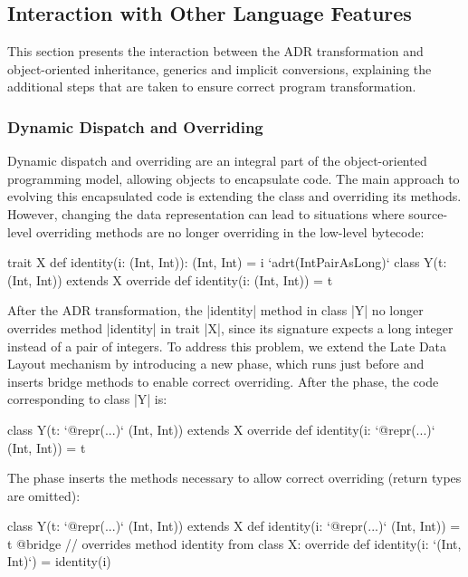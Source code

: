 \subsection{Interaction with Other Language Features}
\label{sec:ildl:language-features}

This section presents the interaction between the ADR transformation and object-oriented inheritance, generics and implicit conversions, explaining the additional steps that are taken to ensure correct program transformation.

\subsubsection*{Dynamic Dispatch and Overriding}
\label{sec:ildl:language-overriding}
Dynamic dispatch and overriding are an integral part of the object-oriented programming model, allowing objects to encapsulate code. The main approach to evolving this encapsulated code is extending the class and overriding its methods. However, changing the data representation can lead to situations where source-level overriding methods are no longer overriding in the low-level bytecode:

\begin{lstlisting-nobreak}
trait X {
  def identity(i: (Int, Int)): (Int, Int) = i
}
`adrt(IntPairAsLong)` {
  class Y(t: (Int, Int)) extends X {
    override def identity(i: (Int, Int)) = t
  }
}
\end{lstlisting-nobreak}

After the ADR transformation, the |identity| method in class |Y| no longer overrides method |identity| in trait |X|, since its signature expects a long integer instead of a pair of integers. To address this problem, we extend the Late Data Layout mechanism by introducing a new \bridge{} phase, which runs just before \coerce{} and inserts bridge methods to enable correct overriding. After the \inject{} phase, the code corresponding to class |Y| is:

\begin{lstlisting-nobreak}
class Y(t: `@repr(...)` (Int, Int)) extends X {
  override def identity(i: `@repr(...)` (Int, Int)) = t
}
\end{lstlisting-nobreak}

The \bridge{} phase inserts the methods necessary to allow correct overriding (return types are omitted):

\begin{lstlisting-nobreak}
class Y(t: `@repr(...)` (Int, Int)) extends X {
  def identity(i: `@repr(...)` (Int, Int)) = t
  @bridge // overrides method identity from class X:
  override def identity(i: `(Int, Int)`) = identity(i)
}
\end{lstlisting-nobreak}

